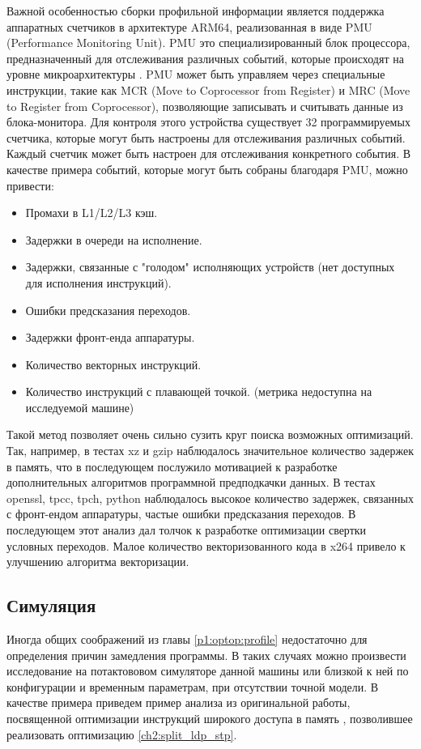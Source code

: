 Важной особенностью сборки профильной информации является поддержка аппаратных счетчиков в архитектуре ARM64, реализованная в виде PMU (Performance Monitoring Unit). PMU это специализированный блок процессора, предназначенный для отслеживания различных событий, которые происходят на уровне микроархитектуры \cite{hansen2020examining}. PMU может быть управляем через специальные инструкции, такие как MCR (Move to Coprocessor from Register) и MRC (Move to Register from Coprocessor), позволяющие записывать и считывать данные из блока-монитора. Для контроля этого устройства существует 32 программируемых счетчика, которые могут быть настроены для отслеживания различных событий. Каждый счетчик может быть настроен для отслеживания конкретного события. В качестве примера событий, которые могут быть собраны благодаря PMU, можно привести:
\begin{itemize}
	\item Промахи в L1/L2/L3 кэш.
	\item Задержки в очереди на исполнение.
	\item Задержки, связанные с "голодом" исполняющих устройств (нет доступных для исполнения инструкций).
	\item Ошибки предсказания переходов.
	\item Задержки фронт-енда аппаратуры.
	\item Количество векторных инструкций.
	\item Количество инструкций с плавающей точкой. (метрика недоступна на исследуемой машине)
\end{itemize}


Такой метод позволяет очень сильно сузить круг поиска возможных оптимизаций. Так, например, в тестах xz и gzip наблюдалось значительное количество задержек в память, что в последующем послужило мотивацией к разработке дополнительных алгоритмов программной предподкачки данных. В тестах openssl, tpcc, tpch, python наблюдалось высокое количество задержек, связанных с фронт-ендом аппаратуры, частые ошибки предсказания переходов. В последующем этот анализ дал толчок к разработке оптимизации свертки условных переходов. Малое количество векторизованного кода в x264 привело к улучшению алгоритма векторизации.


\subsection {Симуляция}\label{p1:optop:sim}

Иногда общих соображений из главы \ref{p1:optop:profile} недостаточно для определения причин замедления программы. В таких случаях можно произвести исследование на потактововом симуляторе данной машины или близкой к ней по конфигурации и временным параметрам, при отсутствии точной модели. В качестве примера приведем пример анализа из оригинальной работы, посвященной оптимизации инструкций широкого доступа в память \cite{chernonog2024widemem}, позволившее реализовать оптимизацию \ref{ch2:split_ldp_stp}.

